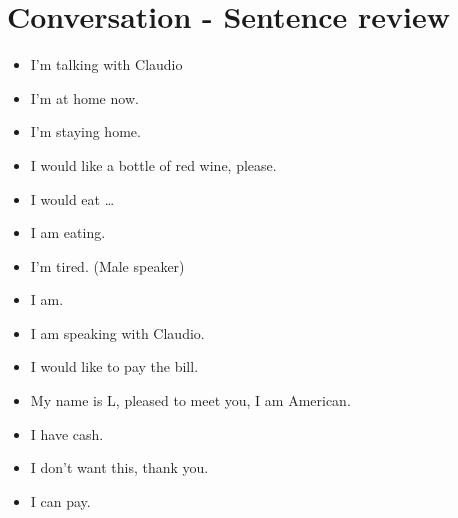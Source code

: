 \section{Conversation - Sentence review}
\begin{itemize}
  \item I'm talking with Claudio                   \\
  \item I'm at home now.                           \\
  \item I'm staying home.                          \\
  \item I would like a bottle of red wine, please. \\
  \item I would eat \ldots                         \\
  \item I am eating.                               \\
  \item I'm tired. (Male speaker)                  \\
  \item I am.                                      \\
  \item I am speaking with Claudio.                \\
  \item I would like to pay the bill.              \\
  \item My name is L, pleased to meet you, I am American. \\
  \item I have cash.                               \\
  \item I don't want this, thank you.              \\
  \item I can pay.                                 \\

\end{itemize}
